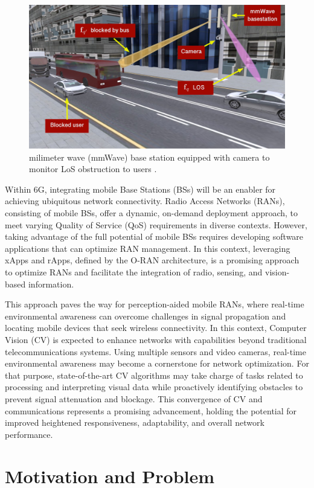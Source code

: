 \begin{figure}[H]
    \centering
    \includegraphics[width=0.7\linewidth]{figures/urban_scenario}
    \caption[mmWave base station equipped with camera to monitor LoS obstruction to users]{milimeter wave (mmWave) base station equipped with camera to monitor LoS obstruction to users \cite{Block_predict}.}
    \label{fig:urban_scenario}
\end{figure}

Within 6G, integrating mobile Base Stations (BSs) will be an enabler for achieving ubiquitous network connectivity.
Radio Access Networks (RANs), consisting of mobile BSs, offer a dynamic, on-demand deployment approach, to meet varying Quality of Service (QoS) requirements in diverse contexts.
However, taking advantage of the full potential of mobile BSs requires developing software applications that can optimize RAN management.
In this context, leveraging xApps and rApps, defined by the O-RAN architecture, is a promising approach to optimize RANs and facilitate the integration of radio, sensing, and vision-based information.

This approach paves the way for perception-aided mobile RANs, where real-time environmental awareness can overcome challenges in signal propagation and locating mobile devices that seek wireless connectivity.
In this context, Computer Vision (CV) is expected to enhance networks with capabilities beyond traditional telecommunications systems.
Using multiple sensors and video cameras, real-time environmental awareness may become a cornerstone for network optimization.
For that purpose, state-of-the-art CV algorithms may take charge of tasks related to processing and interpreting visual data while proactively identifying obstacles to prevent signal attenuation and blockage.
This convergence of CV and communications represents a promising advancement, holding the potential for improved heightened responsiveness, adaptability, and overall network performance.

\section{Motivation and Problem}\label{sec:motivation-and-problem}

